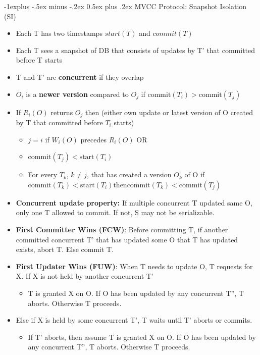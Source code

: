 \documentclass[9pt, landscape]{extarticle}
\makeatletter
\renewcommand{\subsection}{\@startsection{subsection}{2}{0mm}%
  {-1explus -.5ex minus -.2ex}%
  {0.5ex plus .2ex}%
{\normalfont\normalsize\bfseries}}
\makeatother
\begin{document}
\begin{multicols*}{4}
  \subsection{MVCC Protocol: Snapshot Isolation (SI)}
  \begin{itemize}
    \item Each T has two timestamps $start(T)$ and $commit(T)$
    \item Each T sees a snapshot of DB that consists of updates by T' that committed before T starts
    \item T and T' are \textbf{concurrent} if they overlap
    \item $O_i$ is a \textbf{newer version} compared to $O_j$ if $\text{commit}(T_i) > \text{commit}(T_j)$
    \item If $R_i(O)$ returns $O_j$ then (either own update or latest version of O created by T that committed before $T_i$ starts)
    \begin{itemize}
      \item $j = i$ if $W_i(O)$ precedes $R_i(O)$ OR
      \item $\text{commit}(T_j) < \text{start}(T_i)$
      \item For every $T_k$, $k \neq j$, that has created a version $O_k$ of O if $\text{commit}(T_k) < \text{start}(T_i) \text{then} \text{commit}(T_k) < \text{commit}(T_j)$ 
    \end{itemize}
    \item \textbf{Concurrent update property:} If multiple concurrent T updated same O, only one T allowed to commit. If not, S may not be serializable.
    \item \textbf{First Committer Wins (FCW)}: Before committing T, if another committed concurrent T' that has updated some O that T has updated exists, abort T. Else commit T.
    \item \textbf{First Updater Wins (FUW)}: When T needs to update O, T requests for X. If X is not held by another concurrent T'
    \begin{itemize}
      \item T is granted X on O. If O has been updated by any concurrent T'', T aborts. Otherwise T proceeds.
    \end{itemize}
    \item Else if X is held by some concurrent T', T waits until T' aborts or commits.
    \begin{itemize}
      \item If T' aborts, then assume T is granted X on O. If O has been updated by any concurrent T'', T aborts. Otherwise T proceeds.

\end{itemize}
\end{itemize}
\end{multicols*}
\end{document}
